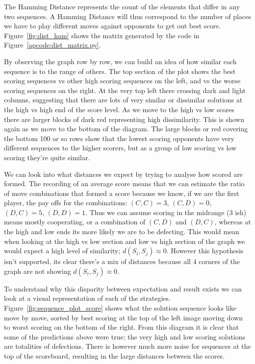 The Hamming Distance represents the count of the elements that differ in any two sequences. 
A Hamming Distance will thus correspond to the number of places we have to play different moves against opponents to get out best score. 
Figure~\ref{fig:dist_ham} shows the matrix generated by the code in Figure~\ref{apcode:dist_matrix.py}.

By observing the graph row by row, we can build an idea of how similar each sequence is to the range of others.
The top section of the plot shows the best scoring sequences vs other high scoring sequences on the left, and vs the worse scoring sequences on the right. 
At the very top left there crossing dark and light columns, suggesting that there are lots of very similar or dissimilar solutions at the high vs high end of the score level.
As we move to  the high vs low scores there are larger blocks of dark red representing high dissimilarity.
This is shown again as we move to the bottom of the diagram.
The large blocks or red covering the bottom 100 or so rows show that the lowest scoring opponents have very different sequences to the higher scorers, but as a group of low scoring vs low scoring they're quite similar.

We can look into what distances we expect by trying to analyse how scored are formed.
The recording of an average score means that we can estimate the ratio of move combinations that formed a score because we know, if we are the first player, the pay offs for the combinations: $(C,C)=3$, $(C,D)=0$, $(D,C)=5$, $(D,D)=1$.
Thus we can assume scoring in the midrange ($3$ ish) means mostly cooperating, or a combination of $(C,D)$ and $(D,C)$, whereas at the high and low ends its more likely we are to be defecting.
This would mean when looking at the high vs low section and low vs high section of the graph we would expect a high level of similarity; $d(S_i,S_j)\approx 0$.
However this hypothesis isn't supported, its clear there's a mix of distances because all 4 corners of the graph are not showing $d(S_i,S_j)\approx 0$. 

To understand why this disparity between expectation and result exists we can look at a visual representation of each of the strategies.
Figure~\ref{fig:sequence_plot_score} shows what the solution sequence looks like move by move, sorted by best scoring at the top of the left image moving down to worst scoring on the bottom of the right.
From this diagram it is clear that some of the predictions above were true; the very high and low scoring solutions are totalities of defections.
There is however much more noise for sequences at the top of the scoreboard, resulting in the large distances between the scores.

